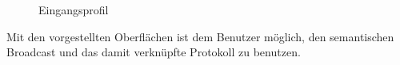 \hspace*{1em}
\begin{minipage}{0.47\linewidth}
	\begin{figure}[H]
		\centering
		\caption{Eingangsprofil}
		\label{fig:profile2}
	\end{figure}
\end{minipage}
\newline\newline\newline Mit den vorgestellten Oberflächen ist dem Benutzer möglich, den semantischen Broadcast und das damit verknüpfte Protokoll zu benutzen. 